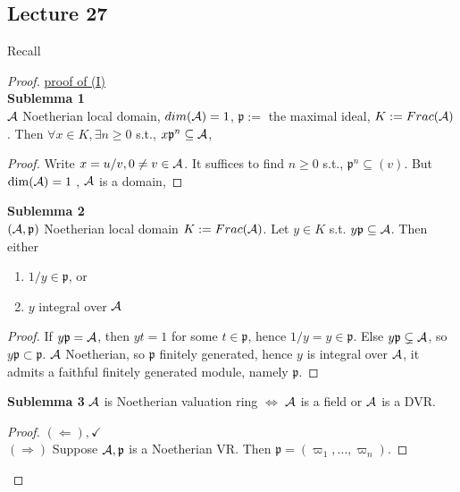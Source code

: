 \documentclass[11pt]{article}
\newcommand{\scp}{{\mathfrak p}}
\newcommand{\cala}{{\cal A}}
\newcommand{\Lrta}{\Longrightarrow}
\newcommand{\Llta}{\Longleftarrow}
\newcommand{\Llrta}{\Longleftrightarrow}
\begin{document}
\subsection{Lecture 27}

Recall 

\begin{proof}
\underline{proof of (I)}\\
\textbf{Sublemma 1}\\
$\cala$ Noetherian local domain, $dim(\cala)=1$, $\scp:=$ the maximal ideal, $K:=Frac(\cala)$.
Then $\forall x\in K,\exists n\geq 0$ s.t., $x\scp^n\subseteq \cala$,
\begin{proof}
Write $x=u/v, 0\neq v\in \cala$. It suffices to find $n\geq 0$ s.t., $\scp^n\subseteq(v)$. But $\dim(\cala)=1$ , $\cala$ is a domain, 
\end{proof}

\textbf{Sublemma 2}\\
$(\cala,\scp)$ Noetherian local domain $K:=Frac(\cala)$. Let $y\in K$ s.t. $y\scp\subseteq \cala$. Then either
\begin{enumerate}[label=(\roman*)]
\item $1/y\in \scp$, or
\item $y$ integral over $\cala$
\end{enumerate}
\begin{proof}
If $y\scp=\cala$, then $yt=1$ for some $t\in \scp$, hence $1/y=y\in\scp$. Else $y\scp\subsetneq \cala$, so $y\scp\subset\scp$. $\cala$ Noetherian, so $\scp$ finitely generated, hence $y$ is  integral over $\cala$, it admits a faithful finitely generated  module, namely $\scp$.
\end{proof}
\textbf{Sublemma 3} $\cala$ is Noetherian valuation ring $\Llrta$ $\cala$ is a field or $\cala$ is a DVR.
\begin{proof}
$(\Llta), \checkmark$\\
$(\Lrta)$ Suppose $\cala,\scp$ is a Noetherian VR. Then $\scp=(\varpi_1,...,\varpi_n)$.


\end{proof}
\end{proof}
\end{document}
